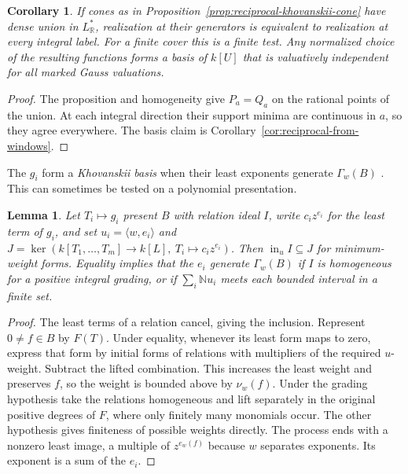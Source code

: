 \documentclass[11pt,reqno]{amsart}
\numberwithin{equation}{section}
\newtheorem{lemma}[theorem]{Lemma}
\newtheorem{corollary}[theorem]{Corollary}
\theoremstyle{definition}
\theoremstyle{remark}
\begin{document}
\begin{corollary}\label{cor:reciprocal-khovanskii-cover}
If cones as in Proposition~\ref{prop:reciprocal-khovanskii-cone}
have dense union in \(L^*_{\mathbb R}\), realization at their
generators is equivalent to realization at every integral label.
For a finite cover this is a finite test. Any normalized choice of
the resulting functions forms a basis of \(k[U]\) that is valuatively
independent for all marked Gauss valuations.
\end{corollary}
\begin{proof}
The proposition and homogeneity give \(P_a=Q_a\) on the rational
points of the union. At each integral direction their support minima
are continuous in \(a\), so they agree everywhere. The basis claim is
Corollary~\ref{cor:reciprocal-from-windows}.
\end{proof}

The \(g_i\) form a \emph{Khovanskii basis} when their least
exponents generate \(\Gamma_w(B)\) \cite{KM}. This can sometimes
be tested on a polynomial presentation.

\begin{lemma}\label{lem:reciprocal-initial-ideal}
Let \(T_i\mapsto g_i\) present \(B\) with relation ideal \(I\),
write \(c_i z^{e_i}\) for the least term of \(g_i\), and set
\(u_i=\langle w,e_i\rangle\) and
\(J=\ker(k[T_1,\ldots,T_m]\to k[L],\ T_i\mapsto c_i z^{e_i})\).
Then \(\operatorname{in}_u I\subseteq J\) for minimum-weight forms.
Equality implies that the \(e_i\) generate \(\Gamma_w(B)\) if
\(I\) is homogeneous for a positive integral grading, or if
\(\sum_i\mathbb N u_i\) meets each bounded interval in a finite set.
\end{lemma}
\begin{proof}
The least terms of a relation cancel, giving the inclusion. Represent
\(0\ne f\in B\) by \(F(T)\). Under equality, whenever its least form
maps to zero, express that form by initial forms of relations with
multipliers of the required \(u\)-weight. Subtract the lifted combination.
This increases the least weight and preserves \(f\), so the weight is
bounded above by \(\nu_w(f)\). Under the grading hypothesis take the
relations homogeneous and lift separately in the original positive
degrees of \(F\), where only finitely many monomials occur. The other
hypothesis gives finiteness of possible weights directly. The process
ends with a nonzero least image, a multiple of \(z^{e_w(f)}\) because
\(w\) separates exponents. Its exponent is a sum of the \(e_i\).
\end{proof}
\end{document}
